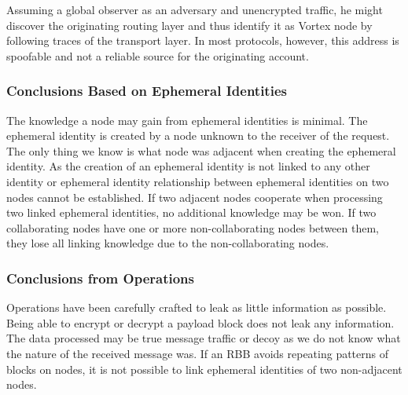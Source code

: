 \documentclass[10pt,journal,compsoc,twocolumn,twoside]{IEEEtran}
\begin{document}
Assuming a global observer as an adversary and unencrypted traffic, he might discover the originating routing layer and thus identify it as Vortex node by following traces of the transport layer. In most protocols, however, this address is spoofable and not a reliable source for the originating account.

\subsubsection{Conclusions Based on Ephemeral Identities}
The knowledge a node may gain from ephemeral identities is minimal. The ephemeral identity is created by a node unknown to the receiver of the request. The only thing we know is what node was adjacent when creating the ephemeral identity. As the creation of an ephemeral identity is not linked to any other identity or ephemeral identity relationship between ephemeral identities on two nodes cannot be established. If two adjacent nodes cooperate when processing two linked ephemeral identities, no additional knowledge may be won. If two collaborating nodes have one or more non-collaborating nodes between them, they lose all linking knowledge due to the non-collaborating nodes. 

\subsubsection{Conclusions from Operations}
Operations have been carefully crafted to leak as little information as possible. Being able to encrypt or decrypt a payload block does not leak any information. The data processed may be true message traffic or decoy as we do not know what the nature of the received message was. If an RBB avoids repeating patterns of blocks on nodes, it is not possible to link ephemeral identities of two non-adjacent nodes. 
\end{document}
